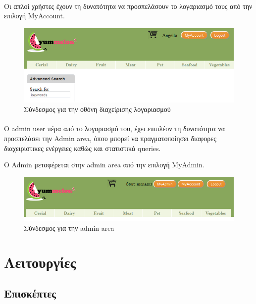 \documentclass[12pt]{article}
\begin{document}
		
		\paragraph{}
		
		  Οι απλοί χρήστες έχουν τη δυνατότητα να προσπελάσουν το λογαριασμό τους από την επιλογή MyAccount.

		\begin{figure}[H]
			\centering
			\includegraphics[width=1\textwidth]{customer}
			\caption{Σύνδεσμος για την οθόνη διαχείρισης λογαριασμού}
		\end{figure}
		
		
		\paragraph{}
		  Ο admin user πέρα από το λογαριασμό του, έχει επιπλέον τη δυνατότητα να προσπελάσει την Admin area, όπου μπορεί να πραγματοποίησει διαφορες διαχειριστικες ενέργειες καθώς και στατιστικά queries.
		  
		  Ο Admin μεταφέρεται στην admin area από την επιλογή MyAdmin.
		\begin{figure}[H]
			\centering
			\includegraphics[width=1\textwidth]{admin}
			\caption{Σύνδεσμος για την admin area}
		\end{figure}
	\section{Λειτουργίες}
	  \subsection{Επισκέπτες}
\end{document}
